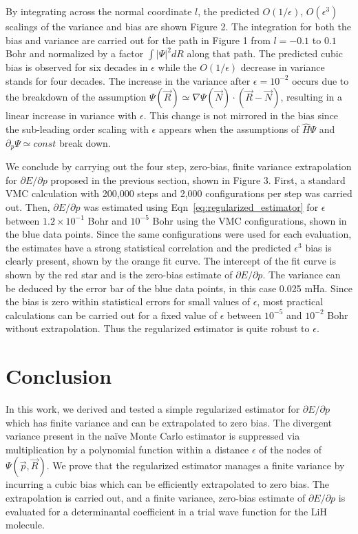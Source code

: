 \documentclass[twocolumn]{revtex4-1}
\begin{document}
By integrating across the normal coordinate $l$, the predicted $O(1/\epsilon)$, $O(\epsilon^3)$ scalings of the variance and bias are shown Figure 2.
The integration for both the bias and variance are carried out for the path in Figure 1 from $l = -0.1$ to $0.1$ Bohr and normalized by a factor $\int |\Psi|^2 dR$ along that path.
The predicted cubic bias is observed for six decades in $\epsilon$ while the $O(1/\epsilon)$ decrease in variance stands for four decades.
The increase in the variance after $\epsilon = 10^{-2}$ occurs due to the breakdown of the assumption $\Psi(\vec{R}) \simeq \nabla\Psi(\vec{N}) \cdot (\vec{R}-\vec{N})$, resulting in a linear increase in variance with $\epsilon$.
This change is not mirrored in the bias since the sub-leading order scaling with $\epsilon$ appears when the assumptions of $\hat{H}\Psi$ and $\partial_p \Psi \simeq const$ break down.

We conclude by carrying out the four step, zero-bias, finite variance extrapolation for $\partial E/\partial p$ proposed in the previous section, shown in Figure 3.
First, a standard VMC calculation with 200,000 steps and 2,000 configurations per step was carried out.
Then, $\partial E/\partial p$ was estimated using Eqn~\ref{eq:regularized_estimator} for $\epsilon$ between $1.2 \times 10^{-1}$ Bohr and $10^{-5}$ Bohr using the VMC configurations, shown in the blue data points.
Since the same configurations were used for each evaluation, the estimates have a strong statistical correlation and the predicted $\epsilon^3$ bias is clearly present, shown by the orange fit curve.
The intercept of the fit curve is shown by the red star and is the zero-bias estimate of $\partial E/\partial p$.
The variance can be deduced by the error bar of the blue data points, in this case 0.025 mHa.
Since the bias is zero within statistical errors for small values of $\epsilon$, most practical calculations can be carried out for a fixed value of $\epsilon$ between $10^{-5}$ and $10^{-2}$ Bohr without extrapolation.
Thus the regularized estimator is quite robust to $\epsilon$.

\section{Conclusion}
In this work, we derived and tested a simple regularized estimator for $\partial E/\partial p$ which has finite variance and can be extrapolated to zero bias.
The divergent variance present in the na\"ive Monte Carlo estimator is suppressed via multiplication by a polynomial function within a distance $\epsilon$ of the nodes of $\Psi(\vec{p}, \vec{R})$. 
We prove that the regularized estimator manages a finite variance by incurring a cubic bias which can be efficiently extrapolated to zero bias.
The extrapolation is carried out, and a finite variance, zero-bias estimate of $\partial E/\partial p$ is evaluated for a determinantal coefficient in a trial wave function for the LiH molecule.
\end{document}
